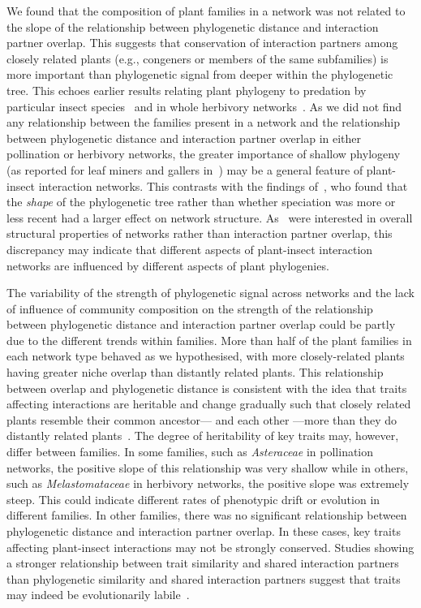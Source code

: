 \documentclass[12pt]{article}
\begin{document}
\begin{spacing}{1.5}
  We found that the composition of plant families in a network
  was not related to the slope of the relationship between phylogenetic
  distance and interaction partner overlap. This suggests that 
  conservation of interaction partners among closely related plants
  (e.g., congeners or members of the same subfamilies) is more
  important than phylogenetic signal from deeper within the phylogenetic
  tree. This echoes earlier results relating plant phylogeny to 
  predation by particular insect species~\citep{Novotny2002,Novotny2004,
  Odegaard2005} and in whole herbivory networks~\citep{Volf2017}. As
  we did not find any relationship between the families present in
  a network and the relationship between phylogenetic distance and
  interaction partner overlap in either pollination or herbivory networks,
  the greater importance of shallow phylogeny (as reported for leaf
  miners and gallers in~\citet{Volf2017}) may be a general 
  feature of plant-insect interaction networks. This contrasts with
  the findings of~\citet{Chamberlain2014}, who found that the \emph{shape}
  of the phylogenetic tree rather than whether speciation was more or
  less recent had a larger effect on network structure. As~\citet{Chamberlain2014}
  were interested in overall structural properties of networks rather
  than interaction partner overlap, this discrepancy may indicate that
  different aspects of plant-insect interaction networks are influenced
  by different aspects of plant phylogenies.


  The variability of the strength of phylogenetic signal across networks 
  and the lack of influence of community composition on the strength of 
  the relationship between phylogenetic distance and interaction partner
  overlap could be partly due to the different trends within families. 
  More than half of the plant families in each network type
  behaved as we hypothesised, with more 
  closely-related plants having greater niche overlap than 
  distantly related plants. This relationship between overlap and 
  phylogenetic distance is consistent with the idea that traits affecting 
  interactions are heritable and change gradually
  such that closely related plants resemble their common ancestor--- and
  each other ---more than they do distantly related 
  plants~\citep{Schemske1999,Gilbert2015,Ponisio2017}. The degree of 
  heritability of key traits may, however, differ between families. In
  some families, such as \emph{Asteraceae} in pollination networks, 
  the positive slope of this relationship was very shallow while in 
  others, such as \emph{Melastomataceae} in herbivory networks, the 
  positive slope was extremely steep. This could indicate different 
  rates of phenotypic drift or evolution in different families. 
  In other families, there was no significant relationship between phylogenetic
  distance and interaction partner overlap. In these cases, key traits affecting 
  plant-insect interactions may not be strongly
  conserved. Studies showing a stronger relationship between trait similarity
  and shared interaction partners than phylogenetic similarity and shared
  interaction partners suggest that traits may indeed be evolutionarily
  labile~\citep{Junker2015,Ibanez2016,Endara2017}. 



\end{spacing}
\end{document}
